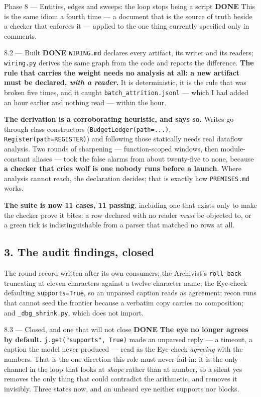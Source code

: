 \documentclass[11pt,a4paper]{article}
\newcommand{\code}[1]{\texttt{#1}}
\newcommand{\done}{\textcolor{good}{\textbf{DONE}}}
\begin{document}
\begin{phasebox}{Phase 8 --- Entities, edges and sweeps: the loop stops being a script \hfill \done}
\noindent This is the same idiom a fourth time --- a document that is the source of truth beside a
checker that enforces it --- applied to the one thing currently specified only in comments.

\begin{resultbox}{8.2 --- Built \hfill \done}
\code{WIRING.md} declares every artifact, its writer and its readers; \code{wiring.py} derives the
same graph from the code and reports the difference. \textbf{The rule that carries the weight needs
no analysis at all: a new artifact must be declared, \emph{with a reader}.} It is deterministic, it
is the rule that was broken five times, and it caught \code{batch\_attrition.jsonl} --- which I had
added an hour earlier and nothing read --- within the hour.

\smallskip
\textbf{The derivation is a corroborating heuristic, and says so.} Writes go through class
constructors (\code{BudgetLedger(path=...)}, \code{Register(path=REGISTER)}) and following those
statically needs real dataflow analysis. Two rounds of sharpening --- function-scoped windows, then
module-constant aliases --- took the false alarms from about twenty-five to none, because
\textbf{a checker that cries wolf is one nobody runs before a launch}. Where analysis cannot reach,
the declaration decides; that is exactly how \code{PREMISES.md} works.

\smallskip
\textbf{The suite is now 11 cases, 11 passing}, including one that exists only to make the checker
prove it bites: a row declared with no reader \emph{must} be objected to, or a green tick is
indistinguishable from a parser that matched no rows at all.
\end{resultbox}

\subsection*{3. The audit findings, closed}
The round record written after its own consumers; the Archivist's \code{roll\_back} truncating at
eleven characters against a twelve-character name; the Eye-check defaulting \code{supports=True},
so an unparsed caption reads as agreement; recon runs that cannot seed the frontier because a
verbatim copy carries no composition; and \code{\_dbg\_shrink.py}, which does not import.

\begin{resultbox}{8.3 --- Closed, and one that will not close \hfill \done}
\textbf{The eye no longer agrees by default.} \code{j.get("supports", True)} made an unparsed reply
--- a timeout, a caption the model never produced --- read as the Eye-check \emph{agreeing} with the
numbers. That is the one direction this role must never fail in: it is the only channel in the loop
that looks at \emph{shape} rather than at number, so a silent yes removes the only thing that could
contradict the arithmetic, and removes it invisibly. Three states now, and an unheard eye neither
supports nor blocks.


\end{resultbox}
\end{phasebox}
\end{document}
